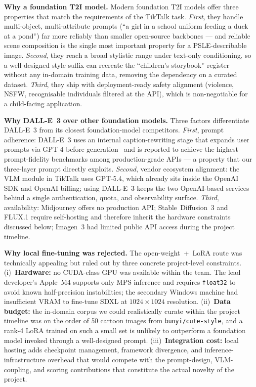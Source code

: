 \documentclass{article}
\begin{document}
\noindent\textbf{Why a foundation T2I model.}
Modern foundation T2I models offer three properties that match the
requirements of the TikTalk task. \textit{First}, they handle
multi-object, multi-attribute prompts (``a girl in a school uniform
feeding a duck at a pond'') far more reliably than smaller open-source
backbones --- and reliable scene composition is the single most
important property for a PSLE-describable image. \textit{Second}, they
reach a broad stylistic range under text-only conditioning, so a
well-designed style suffix can recreate the ``children's storybook''
register without any in-domain training data, removing the dependency
on a curated dataset. \textit{Third}, they ship with deployment-ready
safety alignment (violence, NSFW, recognisable individuals filtered at
the API), which is non-negotiable for a child-facing application.

\noindent\textbf{Why DALL-E~3 over other foundation models.}
Three factors differentiate DALL-E~3 from its closest foundation-model
competitors. \textit{First}, prompt adherence: DALL-E~3 uses an
internal caption-rewriting stage that expands user prompts via GPT-4
before generation~\cite{betker2023dalle3} and is reported to achieve
the highest prompt-fidelity benchmarks among production-grade APIs ---
a property that our three-layer prompt directly exploits.
\textit{Second}, vendor ecosystem alignment: the VLM module in TikTalk
uses GPT-5.4, which already sits inside the OpenAI SDK and OpenAI
billing; using DALL-E~3 keeps the two OpenAI-based services behind a
single authentication, quota, and observability surface.
\textit{Third}, availability: Midjourney offers no production API;
Stable~Diffusion~3 and FLUX.1 require self-hosting and therefore
inherit the hardware constraints discussed below; Imagen~3 had limited
public API access during the project timeline.

\noindent\textbf{Why local fine-tuning was rejected.}
The open-weight~+~LoRA route was technically appealing but ruled out
by three concrete project-level constraints. (i)~\textbf{Hardware:} no
CUDA-class GPU was available within the team. The lead developer's
Apple~M4 supports only MPS inference and requires \texttt{float32} to
avoid known half-precision instabilities; the secondary Windows machine
had insufficient VRAM to fine-tune SDXL at $1024\!\times\!1024$
resolution. (ii)~\textbf{Data budget:} the in-domain corpus we could
realistically curate within the project timeline was on the order of
50 cartoon images from \texttt{bunyi/cute-style}, and a rank-4 LoRA
trained on such a small set is unlikely to outperform a foundation
model invoked through a well-designed prompt.
(iii)~\textbf{Integration cost:} local hosting adds checkpoint
management, framework divergence, and inference-infrastructure overhead
that would compete with the prompt-design, VLM-coupling, and scoring
contributions that constitute the actual novelty of the project.
\end{document}
